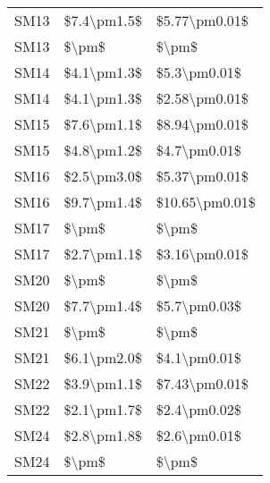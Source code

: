 \begin{longtable}{lll}
SM13        &   \$7.4\textbackslash pm1.5\$ &   \$5.77\textbackslash pm0.01\$ \\
SM13        &         \$\textbackslash pm\$ &           \$\textbackslash pm\$ \\
SM14        &   \$4.1\textbackslash pm1.3\$ &    \$5.3\textbackslash pm0.01\$ \\
SM14        &   \$4.1\textbackslash pm1.3\$ &   \$2.58\textbackslash pm0.01\$ \\
SM15        &   \$7.6\textbackslash pm1.1\$ &   \$8.94\textbackslash pm0.01\$ \\
SM15        &   \$4.8\textbackslash pm1.2\$ &    \$4.7\textbackslash pm0.01\$ \\
SM16        &   \$2.5\textbackslash pm3.0\$ &   \$5.37\textbackslash pm0.01\$ \\
SM16        &   \$9.7\textbackslash pm1.4\$ &  \$10.65\textbackslash pm0.01\$ \\
SM17        &         \$\textbackslash pm\$ &           \$\textbackslash pm\$ \\
SM17        &   \$2.7\textbackslash pm1.1\$ &   \$3.16\textbackslash pm0.01\$ \\
SM20        &         \$\textbackslash pm\$ &           \$\textbackslash pm\$ \\
SM20        &   \$7.7\textbackslash pm1.4\$ &    \$5.7\textbackslash pm0.03\$ \\
SM21        &         \$\textbackslash pm\$ &           \$\textbackslash pm\$ \\
SM21        &   \$6.1\textbackslash pm2.0\$ &    \$4.1\textbackslash pm0.01\$ \\
SM22        &   \$3.9\textbackslash pm1.1\$ &   \$7.43\textbackslash pm0.01\$ \\
SM22        &   \$2.1\textbackslash pm1.7\$ &    \$2.4\textbackslash pm0.02\$ \\
SM24        &   \$2.8\textbackslash pm1.8\$ &    \$2.6\textbackslash pm0.01\$ \\
SM24        &         \$\textbackslash pm\$ &           \$\textbackslash pm\$ \\
\end{longtable}
